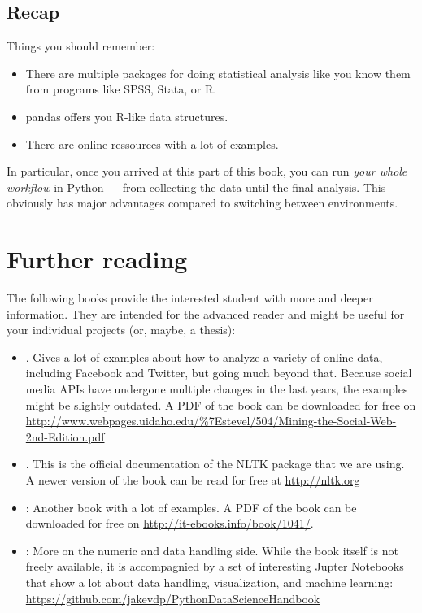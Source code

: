 \documentclass[a4paper,12pt]{book}
\begin{document}
\section{Recap}
Things you should remember:
\begin{itemize}
	\item There are multiple packages for doing statistical analysis like you know them from programs like SPSS, Stata, or R.
	\item pandas offers you R-like data structures.
	\item There are online ressources with a lot of examples.
\end{itemize}
In particular, once you arrived at this part of this book, you can run \emph{your whole workflow} in Python --- from collecting the data until the final analysis. This obviously has major advantages compared to switching between environments.


\chapter{Further reading}
The following books provide the interested student with more and deeper information. They are intended for the advanced reader and might be useful for your individual projects (or, maybe, a thesis):

\begin{itemize}
\item \citealp{Russel2013}. Gives a lot of examples about how to analyze a variety of online data, including Facebook and Twitter, but going much beyond that. Because social media APIs have undergone multiple changes in the last years, the examples might be slightly outdated. A PDF of the book can be downloaded for free on \url{http://www.webpages.uidaho.edu/\%7Estevel/504/Mining-the-Social-Web-2nd-Edition.pdf}
\item \citealp{Bird2009}. This is the official documentation of the NLTK package that we are using. A newer version of the book can be read for free at \url{http://nltk.org}
\item \citealp{McKinney2012}: Another book with a lot of examples. A PDF of the book can be downloaded for free on \url{http://it-ebooks.info/book/1041/}.
\item \citealp{Vanderplas2016}: More on the numeric and data handling side. While the book itself is not freely available, it is accompagnied by a set of interesting Jupter Notebooks that show a lot about data handling, visualization, and machine learning: \url{https://github.com/jakevdp/PythonDataScienceHandbook}
\end{itemize}
\end{document}
